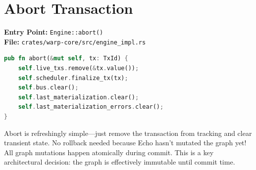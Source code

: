 \section{Abort Transaction}

\textbf{Entry Point:} \texttt{Engine::abort()} \\
\textbf{File:} \texttt{crates/warp-core/src/engine\_impl.rs}

\begin{lstlisting}[language=Rust]
pub fn abort(&mut self, tx: TxId) {
    self.live_txs.remove(&tx.value());
    self.scheduler.finalize_tx(tx);
    self.bus.clear();
    self.last_materialization.clear();
    self.last_materialization_errors.clear();
}
\end{lstlisting}

\begin{commentary}
Abort is refreshingly simple---just remove the transaction from tracking and clear transient state. No rollback needed because Echo hasn't mutated the graph yet! All graph mutations happen atomically during commit. This is a key architectural decision: the graph is effectively immutable until commit time.
\end{commentary}
